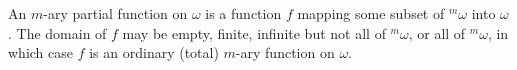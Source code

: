 An $m$-ary partial function on $\omega$ is a function $f$ mapping some subset of ${}^m\omega$ into $\omega$. The domain of $f$ may be empty, finite, infinite but not all of ${}^m\omega$, or all of ${}^m\omega$, in which case $f$ is an ordinary (total) $m$-ary function on $\omega$.
